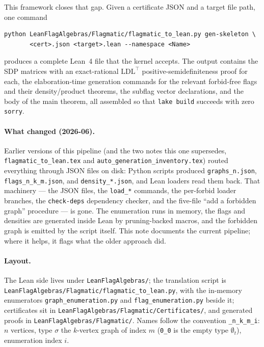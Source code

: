 \documentclass[11pt]{article}
\begin{document}
This framework closes that gap. Given a certificate JSON and a target file path,
one command
\begin{lstlisting}[language={}]
python LeanFlagAlgebras/Flagmatic/flagmatic_to_lean.py gen-skeleton \
       <cert>.json <target>.lean --namespace <Name>
\end{lstlisting}
produces a complete Lean~4 file that the kernel accepts. The output contains the
SDP matrices with an exact-rational $\mathrm{LDL}^\top$
positive-semidefiniteness proof for each, the elaboration-time generation
commands for the relevant forbid-free flags and their density/product theorems,
the subflag vector declarations, and the body of the main theorem, all assembled
so that \texttt{lake build} succeeds with zero \texttt{sorry}.

\paragraph{What changed (2026-06).}
Earlier versions of this pipeline (and the two notes this one supersedes,
\texttt{flagmatic\_to\_lean.tex} and \texttt{auto\_generation\_inventory.tex})
routed everything through JSON files on disk: Python scripts produced
\texttt{graphs\_n.json}, \texttt{flags\_n\_k\_m.json}, and
\texttt{density\_*.json}, and Lean loaders read them back. That machinery
--- the JSON files, the \texttt{load\_*} commands, the per-forbid loader
branches, the \texttt{check-deps} dependency checker, and the five-file
``add a forbidden graph'' procedure --- is gone. The enumeration runs in memory,
the flags and densities are generated inside Lean by pruning-backed macros, and
the forbidden graph is emitted by the script itself. This note documents the
current pipeline; where it helps, it flags what the older approach did.

\paragraph{Layout.}
The Lean side lives under \texttt{LeanFlagAlgebras/}; the translation script is
\texttt{LeanFlagAlgebras/Flag\-matic/flagmatic\_to\_lean.py}, with the in-memory
enumerators \texttt{graph\_enumeration.py} and \texttt{flag\_enumeration.py}
beside it; certificates sit in
\texttt{LeanFlagAlgebras/Flag\-matic/Certificates/}, and generated proofs in
\texttt{LeanFlagAlgebras/Flagmatic/}. Names follow the convention
\texttt{\_n\_k\_m\_i}: $n$ vertices, type $\sigma$ the $k$-vertex graph of index
$m$ (\texttt{0\_0} is the empty type $\emptyset_t$), enumeration index $i$.
\end{document}
